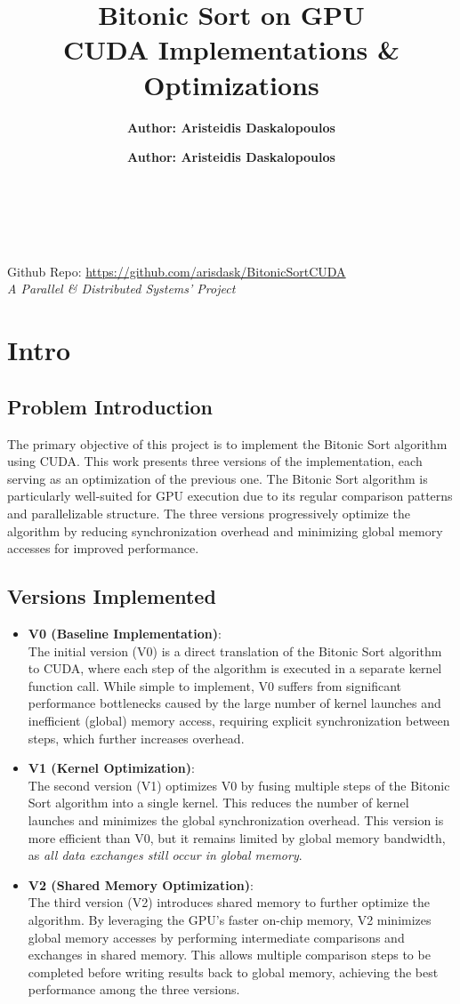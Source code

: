 \documentclass[12pt]{article}
\title{\textbf{\textsf{Bitonic Sort on GPU \\ CUDA Implementations \& Optimizations}}}
\date{\monthname\ \the\year}
\author{\textbf{Author: Aristeidis Daskalopoulos}} \\
\newcommand{\instructions}[1]{%
  \ifthenelse{\boolean{showinstructions}}%
    {#1}%
    {\ignorespaces}%
}
\newcommand{\maketitlepage}{%
    \begin{titlepage}
        \maketitle
        \thispagestyle{empty}
        \vfill 
        \centering
        \author{\textbf{Author: Aristeidis Daskalopoulos}} \\
        Github Repo: \url{https://github.com/arisdask/BitonicSortCUDA} \\ 
        \textit{A Parallel \& Distributed Systems' Project}
        \vfill 
    \end{titlepage}
    \newpage
}
\begin{document}
\maketitlepage

\instructions{\section{Intro}
\subsection*{Problem Introduction}
The primary objective of this project is to implement the Bitonic Sort algorithm using CUDA. This work presents three versions of the implementation, each serving as an optimization of the previous one. The Bitonic Sort algorithm is particularly well-suited for GPU execution due to its regular comparison patterns and parallelizable structure. The three versions progressively optimize the algorithm by reducing synchronization overhead and minimizing global memory accesses for improved performance.

\subsection*{Versions Implemented}
\begin{itemize}
    \item \textbf{V0 (Baseline Implementation)}: \\
    The initial version (V0) is a direct translation of the Bitonic Sort algorithm to CUDA, where each step of the algorithm is executed in a separate kernel function call. While simple to implement, V0 suffers from significant performance bottlenecks caused by the large number of kernel launches and inefficient (global) memory access, requiring explicit synchronization between steps, which further increases overhead.

    \item \textbf{V1 (Kernel Optimization)}: \\
    The second version (V1) optimizes V0 by fusing multiple steps of the Bitonic Sort algorithm into a single kernel. This reduces the number of kernel launches and minimizes the global synchronization overhead. This version is more efficient than V0, but it remains limited by global memory bandwidth, as \textit{all data exchanges still occur in global memory}.

    \item \textbf{V2 (Shared Memory Optimization)}: \\
    The third version (V2) introduces shared memory to further optimize the algorithm. By leveraging the GPU's faster on-chip memory, V2 minimizes global memory accesses by performing intermediate comparisons and exchanges in shared memory. This allows multiple comparison steps to be completed before writing results back to global memory, achieving the best performance among the three versions.
\end{itemize}

}
\end{document}
